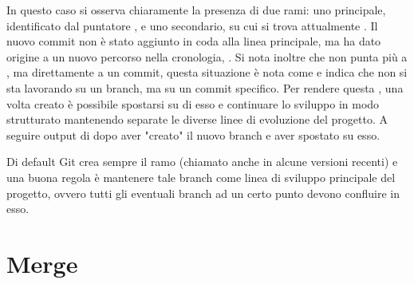 In questo caso si osserva chiaramente la presenza di due rami: uno principale, identificato dal puntatore , e uno secondario, su cui si trova attualmente . Il nuovo commit non è stato aggiunto in coda alla linea principale, ma ha dato origine a un nuovo percorso nella cronologia, .
Si nota inoltre che  non punta più a , ma direttamente a un commit, questa situazione è nota come  e indica che non si sta lavorando su un branch, ma su un commit specifico. Per rendere questa , una volta creato è possibile spostarsi su di esso e continuare lo sviluppo in modo strutturato mantenendo separate le diverse linee di evoluzione del progetto. A seguire output di  dopo aver "creato" il nuovo branch e aver spostato  su esso.

Di default Git crea sempre il ramo  (chiamato anche  in alcune versioni recenti) e una buona regola è mantenere tale branch come linea di sviluppo principale del progetto, ovvero tutti gli eventuali branch ad un certo punto devono confluire in esso.



\section{Merge}
\label{sec:merge}

